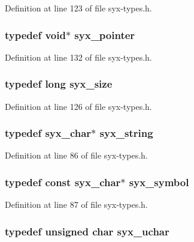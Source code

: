 Definition at line 123 of file syx-types.h.\hypertarget{syx-types_8h_51c518ab1f082eb4330ca143afb1584f}{
\subsubsection{\setlength{\rightskip}{0pt plus 5cm}typedef void$\ast$ {\bf syx\_\-pointer}}}
\label{syx-types_8h_51c518ab1f082eb4330ca143afb1584f}




Definition at line 132 of file syx-types.h.\hypertarget{syx-types_8h_c33c3b1cda2a02ee8987fd22f1ce89be}{
\subsubsection{\setlength{\rightskip}{0pt plus 5cm}typedef long {\bf syx\_\-size}}}
\label{syx-types_8h_c33c3b1cda2a02ee8987fd22f1ce89be}




Definition at line 126 of file syx-types.h.\hypertarget{syx-types_8h_1bff1fd86072dd98849437bc9dcb35c3}{
\subsubsection{\setlength{\rightskip}{0pt plus 5cm}typedef {\bf syx\_\-char}$\ast$ {\bf syx\_\-string}}}
\label{syx-types_8h_1bff1fd86072dd98849437bc9dcb35c3}




Definition at line 86 of file syx-types.h.\hypertarget{syx-types_8h_9663af54b7b72f5d8be5f754ef356525}{
\subsubsection{\setlength{\rightskip}{0pt plus 5cm}typedef const {\bf syx\_\-char}$\ast$ {\bf syx\_\-symbol}}}
\label{syx-types_8h_9663af54b7b72f5d8be5f754ef356525}




Definition at line 87 of file syx-types.h.\hypertarget{syx-types_8h_fba920bf291b2a86b5a180e867d0dadf}{
\subsubsection{\setlength{\rightskip}{0pt plus 5cm}typedef unsigned char {\bf syx\_\-uchar}}}
\label{syx-types_8h_fba920bf291b2a86b5a180e867d0dadf}




